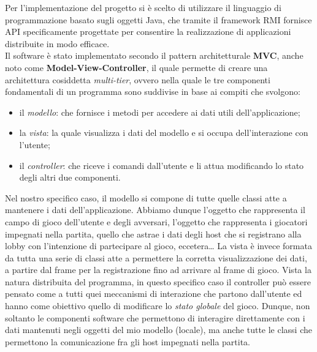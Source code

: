 Per l'implementazione del progetto si è scelto di utilizzare il linguaggio 
di programmazione basato sugli oggetti Java, che tramite il framework RMI 
fornisce API specificamente progettate per consentire la realizzazione di 
applicazioni distribuite in modo efficace.
\\
Il software è stato implementato secondo il pattern architetturale \textbf{MVC},
anche noto come \textbf{Model-View-Controller}, il quale permette di creare una
architettura cosiddetta \textit{multi-tier}, ovvero nella quale le tre
componenti fondamentali di un programma sono suddivise in base ai compiti che
svolgono:
\begin{itemize}
	\item il \textit{modello}: che fornisce i metodi per accedere ai dati utili
	dell'applicazione;
	\item la \textit{vista}: la quale visualizza i dati del modello e si 
occupa
	dell'interazione con l'utente;
	\item il \textit{controller}: che riceve i comandi dall'utente e li attua
	modificando lo stato degli altri due componenti.
\end{itemize}
Nel nostro specifico caso, il modello si compone di tutte quelle classi atte a
mantenere i dati dell'applicazione. Abbiamo dunque l'oggetto che rappresenta il
campo di gioco dell'utente e degli avversari, l'oggetto che rappresenta i
giocatori impegnati nella partita, quello che astrae i dati degli host che si
registrano alla lobby con l'intenzione di partecipare al gioco,
eccetera\dots\newline
La vista è invece formata da tutta una serie di classi atte a permettere la
corretta visualizzazione dei dati, a partire dal frame per la registrazione fino
ad arrivare al frame di gioco.\newline
Vista la natura distribuita del programma, in questo specifico caso il
controller può essere pensato come a tutti quei meccanismi di interazione che
partono dall'utente ed hanno come obiettivo quello di modificare lo
\textit{stato globale} del gioco. Dunque, non soltanto le componenti software
che permettono di interagire direttamente con i dati mantenuti negli oggetti
del mio modello (locale), ma anche tutte le classi che permettono la
comunicazione fra gli host impegnati nella partita.\newline